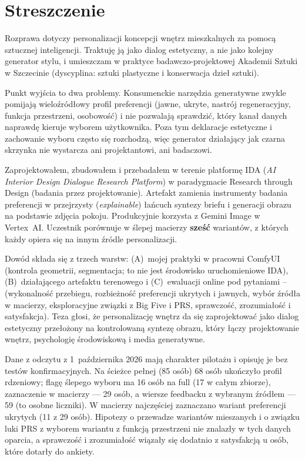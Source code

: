 \chapter*{Streszczenie}

Rozprawa dotyczy personalizacji koncepcji wnętrz mieszkalnych za pomocą sztucznej inteligencji. Traktuję ją jako dialog estetyczny, a nie jako kolejny generator stylu, i umieszczam w praktyce badawczo-projektowej Akademii Sztuki w Szczecinie (dyscyplina: sztuki plastyczne i konserwacja dzieł sztuki).

Punkt wyjścia to dwa problemy. Konsumenckie narzędzia generatywne zwykle pomijają wieloźródłowy profil preferencji (jawne, ukryte, nastrój regeneracyjny, funkcja przestrzeni, osobowość) i nie pozwalają sprawdzić, który kanał danych naprawdę kieruje wyborem użytkownika. Poza tym deklaracje estetyczne i zachowanie wyboru często się rozchodzą, więc generator działający jak czarna skrzynka nie wystarcza ani projektantowi, ani badaczowi.

Zaprojektowałem, zbudowałem i przebadałem w terenie platformę IDA (\emph{AI Interior Design Dialogue Research Platform}) w paradygmacie Research through Design (badania przez projektowanie). Artefakt zamienia instrumenty badania preferencji w przejrzysty (\emph{explainable}) łańcuch syntezy briefu i generacji obrazu na podstawie zdjęcia pokoju. Produkcyjnie korzysta z Gemini Image w Vertex~AI. Uczestnik porównuje w ślepej macierzy \textbf{sześć} wariantów, z których każdy opiera się na innym źródle personalizacji.

Dowód składa się z trzech warstw: (A)~mojej praktyki w pracowni ComfyUI (kontrola geometrii, segmentacja; to nie jest środowisko uruchomieniowe IDA), (B)~działającego artefaktu terenowego i (C)~ewaluacji online pod pytaniami -- (wykonalność przebiegu, rozbieżność preferencji ukrytych i jawnych, wybór źródła w macierzy, eksploracyjne związki z Big Five i PRS, sprawczość, zrozumiałość i satysfakcja). Teza głosi, że personalizację wnętrz da się zaprojektować jako dialog estetyczny przełożony na kontrolowaną syntezę obrazu, który łączy projektowanie wnętrz, psychologię środowiskową i media generatywne.

Dane z odczytu z 1~października 2026 mają charakter pilotażu i opisuję je bez testów konfirmacyjnych. Na ścieżce pełnej (85 osób) 68 osób ukończyło profil rdzeniowy; flagę ślepego wyboru ma 16 osób na full (17 w całym zbiorze), zaznaczenie w macierzy --- 29 osób, a wiersze feedbacku z wybranym źródłem --- 59 (to osobne liczniki). W macierzy najczęściej zaznaczano wariant preferencji ukrytych (11 z 29 osób). Hipotezy o przewadze wariantów mieszanych i o związku luki PRS z wyborem wariantu z funkcją przestrzeni nie znalazły w tych danych oparcia, a sprawczość i zrozumiałość wiązały się dodatnio z satysfakcją u osób, które dotarły do ankiety.

